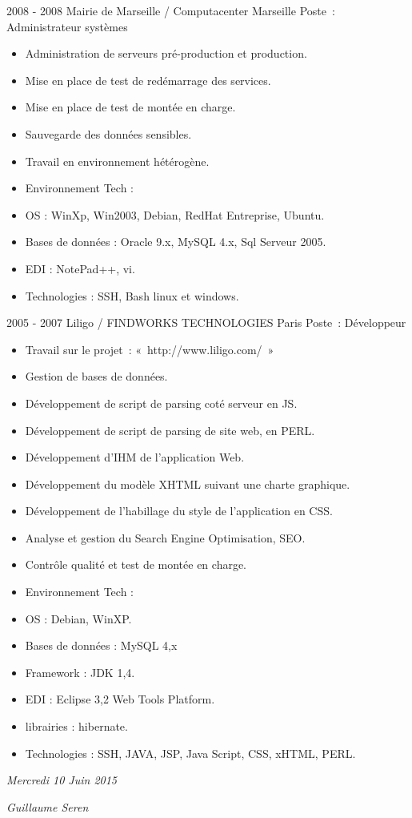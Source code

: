 \documentclass[print]{GuillaumeSeren-cv}
\begin{document}
\begin{entrylist}
  \entryBul
  {2008 - 2008}
  {Mairie de Marseille / Computacenter}
  {Marseille}
  {Poste : Administrateur systèmes}
  {
      \begin{itemize}[leftmargin=*]
          \setlength\itemsep{0pt}
          \item Administration de serveurs pré-production et production.
          \item Mise en place de test de redémarrage des services.
          \item Mise en place de test de montée en charge.
          \item Sauvegarde des données sensibles.
          \item Travail en environnement hétérogène.
          \item Environnement Tech :
          \item OS : WinXp, Win2003, Debian, RedHat Entreprise, Ubuntu.
          \item Bases de données : Oracle 9.x, MySQL 4.x, Sql Serveur 2005.
          \item EDI : NotePad++, vi.
          \item Technologies : SSH, Bash linux et windows.
      \end{itemize}
  }

  \entryBul
  {2005 - 2007}
  {Liligo / FINDWORKS TECHNOLOGIES}
  {Paris}
  {Poste : Développeur}
  {
      \begin{itemize}[leftmargin=*]
          \setlength\itemsep{0pt}
          \item Travail sur le projet : « http://www.liligo.com/ »
          \item Gestion de bases de données.
          \item Développement de script de parsing coté serveur en JS.
          \item Développement de script de parsing de site web, en PERL.
          \item Développement d'IHM de l'application Web.
          \item Développement du modèle XHTML suivant une charte graphique.
          \item Développement de l’habillage du style de l'application en CSS.
          \item Analyse et gestion du Search Engine Optimisation, SEO.
          \item Contrôle qualité et test de montée en charge.
          \item Environnement Tech :
          \item OS : Debian, WinXP.
          \item Bases de données : MySQL 4,x
          \item Framework : JDK 1,4.
          \item EDI : Eclipse 3,2 Web Tools Platform.
          \item librairies : hibernate.
          \item Technologies : SSH, JAVA, JSP, Java Script, CSS, xHTML, PERL.
      \end{itemize}
  }
\end{entrylist}

\begin{flushleft}
\emph{Mercredi 10 Juin 2015}
\end{flushleft}

\begin{flushright}
\emph{Guillaume Seren}
\end{flushright}
\end{document}
